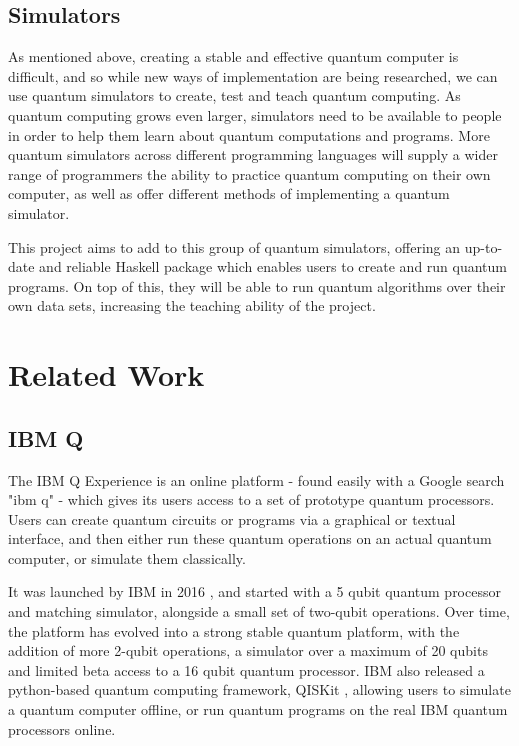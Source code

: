 \documentclass[a4paper,11pt, titlepage, twoside]{article}
\begin{document}
\subsection{Simulators}
As mentioned above, creating a stable and effective quantum computer is difficult, and so while new ways of implementation are being researched, we can use quantum simulators to create, test and teach quantum computing. As quantum computing grows even larger, simulators need to be available to people in order to help them learn about quantum computations and programs. More quantum simulators across different programming languages will supply a wider range of programmers the ability to practice quantum computing on their own computer, as well as offer different methods of implementing a quantum simulator.\par
This project aims to add to this group of quantum simulators, offering an up-to-date and reliable Haskell package which enables users to create and run quantum programs. On top of this, they will be able to run quantum algorithms over their own data sets, increasing the teaching ability of the project.

\section{Related Work}
\subsection{IBM Q}
The IBM Q Experience is an online platform \cite{ibmqexperience} - found easily with a Google search "ibm q" - which gives its users access to a set of prototype quantum processors. Users can create quantum circuits or programs via a graphical or textual interface, and then either run these quantum operations on an actual quantum computer, or simulate them classically.\par
It was launched by IBM in 2016 \cite{ibmlaunch}, and started with a 5 qubit quantum processor and matching simulator, alongside a small set of two-qubit operations. Over time, the platform has evolved into a strong stable quantum platform, with the addition of more 2-qubit operations, a simulator over a maximum of 20 qubits and limited beta access to a 16 qubit quantum processor. IBM also released a python-based quantum computing framework, QISKit \cite{qiskit}, allowing users to simulate a quantum computer offline, or run quantum programs on the real IBM quantum processors online.
\end{document}
